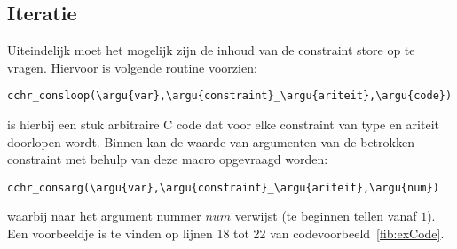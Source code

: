 \subsection{Iteratie}

Uiteindelijk moet het mogelijk zijn de inhoud van de constraint store op te vragen. Hiervoor is volgende routine voorzien: \begin{Verbatim}[commandchars=\\\{\}]
  cchr_consloop(\argu{var},\argu{constraint}_\argu{ariteit},\argu{code})
\end{Verbatim}
 is hierbij een stuk arbitraire C code dat voor elke constraint van type  en ariteit  doorlopen wordt. Binnen  kan de waarde van argumenten van de betrokken constraint met behulp van deze macro opgevraagd worden: \begin{Verbatim}[commandchars=\\\{\}]
  cchr_consarg(\argu{var},\argu{constraint}_\argu{ariteit},\argu{num})
\end{Verbatim}
waarbij  naar het argument nummer $num$ verwijst (te beginnen tellen vanaf $1$). Een voorbeeldje is te vinden op lijnen 18 tot 22 van codevoorbeeld~\ref{fib:exCode}.
